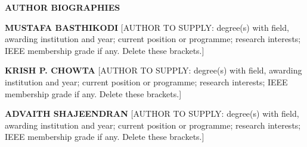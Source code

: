 \documentclass[10pt,twocolumn]{article}
\begin{document}
\vspace{10pt}
{\helv\fontsize{9}{11}\bfseries\color{accessblue}\MakeTextUppercase{Author Biographies}\par}
\vspace{4pt}
{\fontsize{8}{9.5}\selectfont

\noindent\begin{minipage}[t]{1.0in}\vspace{0pt}%
\end{minipage}\hfill
\begin{minipage}[t]{\dimexpr\columnwidth-1.1in\relax}\vspace{0pt}%
\textbf{MUSTAFA BASTHIKODI} [AUTHOR TO SUPPLY: degree(s) with field, awarding institution and year; current position or programme; research interests; IEEE membership grade if any. Delete these brackets.]
\end{minipage}

\vspace{6pt}

\noindent\begin{minipage}[t]{1.0in}\vspace{0pt}%
\end{minipage}\hfill
\begin{minipage}[t]{\dimexpr\columnwidth-1.1in\relax}\vspace{0pt}%
\textbf{KRISH P. CHOWTA} [AUTHOR TO SUPPLY: degree(s) with field, awarding institution and year; current position or programme; research interests; IEEE membership grade if any. Delete these brackets.]
\end{minipage}

\vspace{8pt}
\noindent\begin{minipage}[t]{1.0in}\vspace{0pt}%
\end{minipage}\hfill
\begin{minipage}[t]{\dimexpr\columnwidth-1.1in\relax}\vspace{0pt}%
\textbf{ADVAITH SHAJEENDRAN} [AUTHOR TO SUPPLY: degree(s) with field, awarding institution and year; current position or programme; research interests; IEEE membership grade if any. Delete these brackets.]
\end{minipage}

}
\end{document}
